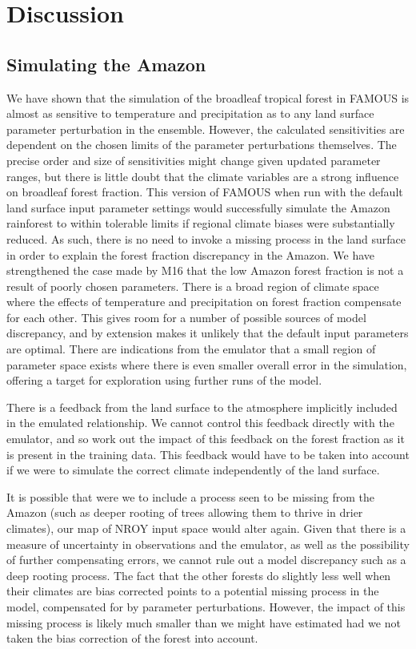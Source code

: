 \documentclass[gmd, manuscript]{copernicus}
\begin{document}
\section{Discussion}\label{sec:discussion}
\subsection{Simulating the Amazon}\label{ssec:simulating}
We have shown that the simulation of the broadleaf tropical forest in FAMOUS is almost as sensitive to temperature and precipitation as to any land surface parameter perturbation in the ensemble. However, the calculated sensitivities are dependent on the chosen limits of the parameter perturbations themselves. The precise order and size of sensitivities might change given updated parameter ranges, but there is little doubt that the climate variables are a strong influence on broadleaf forest fraction. This version of FAMOUS when run with the default land surface input parameter settings would successfully simulate the Amazon rainforest to within tolerable limits if regional climate biases were substantially reduced. As such, there is no need to invoke a missing process in the land surface in order to explain the forest fraction discrepancy in the Amazon. We have strengthened the case made by M16 that the low Amazon forest fraction is not a result of poorly chosen parameters.  There is a broad region of climate space where the effects of temperature and precipitation on forest fraction compensate for each other. This gives room for a number of possible sources of model discrepancy, and by extension makes it unlikely that the default input parameters are optimal. There are indications from the emulator that a small region of parameter space exists where there is even smaller overall error in the simulation, offering a target for exploration using further runs of the model.
 
There is a feedback from the land surface to the atmosphere implicitly included in the emulated relationship. We cannot control this feedback directly with the emulator, and so work out the impact of this feedback on the forest fraction as it is present in the training data. This feedback would have to be taken into account if we were to simulate the correct climate independently of the land surface.

It is possible that were we to include a process seen to be missing from the Amazon (such as deeper rooting of trees allowing them to thrive in drier climates), our map of NROY input space would alter again. Given that there is a measure of uncertainty in observations and the emulator, as well as the possibility of further compensating errors, we cannot rule out a model discrepancy such as a deep rooting process. The fact that the other forests do slightly less well when their climates are bias corrected points to a potential missing process in the model, compensated for by parameter perturbations. However, the impact of this missing process is likely much smaller than we might have estimated had we not taken the bias correction of the forest into account.
\end{document}
